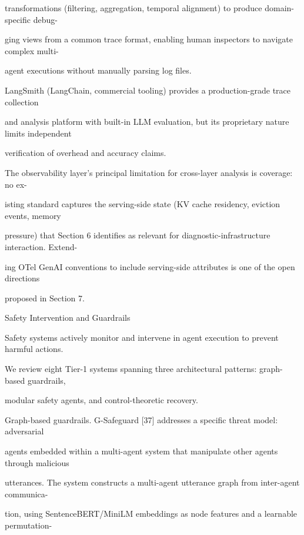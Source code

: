 \begin{flushleft}
\noindent transformations (filtering, aggregation, temporal alignment) to produce domain-specific debug-\par
\noindent ging views from a common trace format, enabling human inspectors to navigate complex multi-\par
\noindent agent executions without manually parsing log files.\par
\noindent  LangSmith (LangChain, commercial tooling) provides a production-grade trace collection\par
\noindent and analysis platform with built-in LLM evaluation, but its proprietary nature limits independent\par
\noindent verification of overhead and accuracy claims.\par
\noindent  The observability layer’s principal limitation for cross-layer analysis is coverage: no ex-\par
\noindent isting standard captures the serving-side state (KV cache residency, eviction events, memory\par
\noindent pressure) that Section 6 identifies as relevant for diagnostic-infrastructure interaction. Extend-\par
\noindent ing OTel GenAI conventions to include serving-side attributes is one of the open directions\par
\noindent proposed in Section 7.\par
\par\smallskip
{} Safety Intervention and Guardrails\par
\noindent Safety systems actively monitor and intervene in agent execution to prevent harmful actions.\par
\noindent We review eight Tier-1 systems spanning three architectural patterns: graph-based guardrails,\par
\noindent modular safety agents, and control-theoretic recovery.\par
\par\smallskip
\noindent Graph-based guardrails. G-Safeguard [37] addresses a specific threat model: adversarial\par
\noindent agents embedded within a multi-agent system that manipulate other agents through malicious\par
\noindent utterances. The system constructs a multi-agent utterance graph from inter-agent communica-\par
\noindent tion, using SentenceBERT/MiniLM embeddings as node features and a learnable permutation-\par

\end{flushleft}

